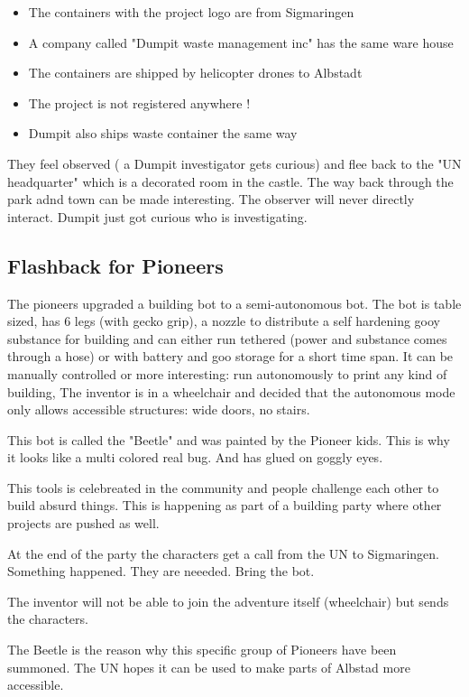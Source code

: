 \begin{itemize}
    \item The containers with the project logo are from Sigmaringen
    \item A company called "Dumpit waste management inc" has the same ware house
    \item The containers are shipped by helicopter drones to Albstadt
    \item The project is not registered anywhere !
    \item Dumpit also ships waste container the same way
\end{itemize}

They feel observed ( a Dumpit investigator gets curious) and flee back to the "UN headquarter" which is a decorated room in the castle. The way back through the park adnd town can be made interesting. The observer will never directly interact. Dumpit just got curious who is investigating.

\subsection{Flashback for Pioneers}

The pioneers upgraded a building bot to a semi-autonomous bot. The bot is table sized, has 6 legs (with gecko grip), a nozzle to distribute a self hardening gooy substance for building and can either run tethered (power and substance comes through a hose) or with battery and goo storage for a short time span. It can be manually controlled or more interesting: run autonomously to print any kind of building, The inventor is in a wheelchair and decided that the autonomous mode only allows accessible structures: wide doors, no stairs.

This bot is called the "Beetle" and was painted by the Pioneer kids. This is why it looks like a multi colored real bug. And has glued on goggly eyes.

This tools is celebreated in the community and people challenge each other to build absurd things. This is happening as part of a building party where other projects are pushed as well.
 
At the end of the party the characters get a call from the UN to Sigmaringen. Something happened. They are neeeded. Bring the bot.

The inventor will not be able to join the adventure itself (wheelchair) but sends the characters.

The Beetle is the reason why this specific group of Pioneers have been summoned. The UN hopes it can be used to make parts of Albstad more accessible.

